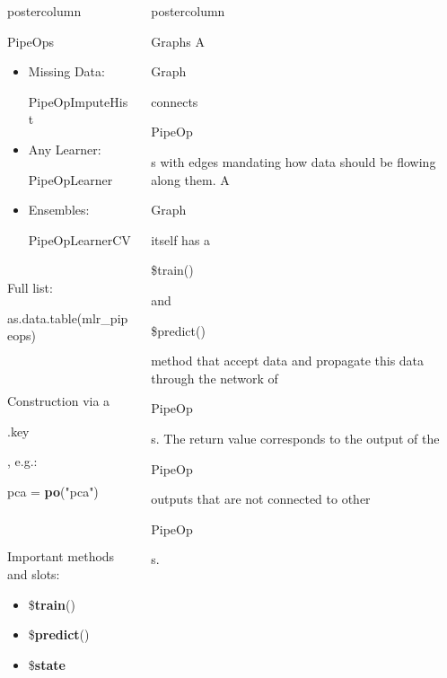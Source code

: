 \documentclass{beamer}
\newlength{\columnheight} %
\newcommand{\codeinline}[1]{\begin{codeboxinline}#1\end{codeboxinline}}
\begin{document}
\begin{frame}[fragile]{}
\begin{columns}
\begin{column}{.245\textwidth}
\begin{beamercolorbox}[center]{postercolumn}
\begin{minipage}{.98\textwidth}
{\begin{myblock}{PipeOps}
\begin{itemize}
                \item Missing Data: \codeinline{PipeOpImputeHist}
                \item Any Learner: \codeinline{PipeOpLearner}
                \item Ensembles: \codeinline{PipeOpLearnerCV}
              \end{itemize}
              \ \\
              Full list: \codeinline{as.data.table(mlr\_pipeops)}\\
              \ \\
              Construction via a \codeinline{.key}, e.g.: \codeinline{pca = \textbf{po}("pca")}\\
              \ \\
              Important methods and slots:
              \begin{itemize}
                \item \codeinline{\$\textbf{train}()} %
                \item \codeinline{\$\textbf{predict}()} %
                \item \codeinline{\$\textbf{state}} %
              \end{itemize}
						\end{myblock}
						\vfill}
				\end{minipage}
			\end{beamercolorbox}
		\end{column}
		\begin{column}{.245\textwidth}
			\begin{beamercolorbox}[center]{postercolumn}
				\begin{minipage}{.98\textwidth}
					\parbox[t][\columnheight]{\textwidth}{
						\begin{myblock}{Graphs}
              A \codeinline{Graph} connects \codeinline{PipeOp}s with edges mandating how data should be flowing along them. A \codeinline{Graph} itself has a \codeinline{\$train()} and \codeinline{\$predict()} method that accept data and propagate this data through the network of \codeinline{PipeOp}s. The return value corresponds to the output of the \codeinline{PipeOp} outputs that are not connected to other \codeinline{PipeOp}s.\\

\end{myblock}}
\end{minipage}
\end{beamercolorbox}
\end{column}
\end{columns}
\end{frame}
\end{document}
